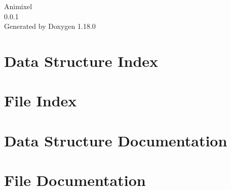 \documentclass[twoside]{book}
\newcommand{\+}{\discretionary{\mbox{\scriptsize$\hookleftarrow$}}{}{}}
\newcommand{\clearemptydoublepage}{%
    \newpage{\pagestyle{empty}\cleardoublepage}%
  }
\begin{document}
  \raggedbottom
    \hypersetup{pageanchor=false,
                bookmarksnumbered=true,
                pdfencoding=unicode
               }
  \begin{titlepage}
  \vspace*{7cm}
  \begin{center}%
  {\Large Animixel}\\
  [1ex]\large 0.\+0.\+1 \\
  \vspace*{1cm}
  {\large Generated by Doxygen 1.18.0}\\
  \end{center}
  \end{titlepage}
  \clearemptydoublepage
  \tableofcontents
  \clearemptydoublepage
  \hypersetup{pageanchor=true}
\chapter{Data Structure Index}

\chapter{File Index}

\chapter{Data Structure Documentation}


\chapter{File Documentation}




  \backmatter
  \newpage
  \clearemptydoublepage
  \printindex
\end{document}
